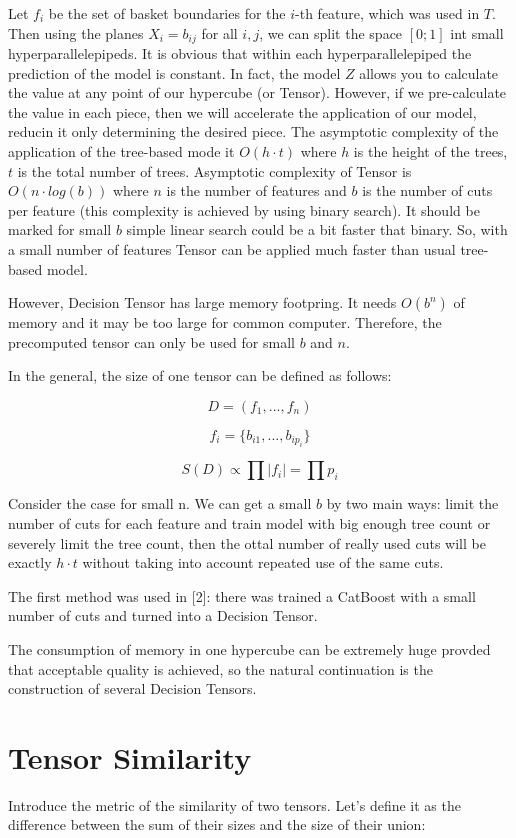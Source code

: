 \documentclass[a4paper]{jpconf}
\begin{document}
Let $f_i$ be the set of basket boundaries for the $i$-th feature, which was used in $T$. Then using the planes $X_i = b_{ij}$ for all $i,j$, we can split the space $[0;1]$ int small hyperparallelepipeds. It is obvious that within each hyperparallelepiped the prediction of the model is constant.
In fact, the model $Z$ allows you to calculate the value at any point of our hypercube (or Tensor). However, if we pre-calculate the value in each piece, then we will accelerate the application of our model, reducin it only determining the desired piece. The asymptotic complexity of the application of the tree-based mode it $O(h\cdot t)$ where $h$ is the height of the trees, $t$ is the total number of trees. Asymptotic complexity of Tensor is $O(n\cdot log(b))$ where $n$ is the number of features and $b$ is the number of cuts per feature (this complexity is achieved by using binary search). It should be marked for small $b$ simple linear search could be a bit faster that binary. So, with a small number of features Tensor can be applied much faster than usual tree-based model.

However, Decision Tensor has large memory footpring. It needs $O(b^n)$ of memory and it may be too large for common computer. Therefore, the precomputed tensor can only be used for small $b$ and $n$.

In the general, the size of one tensor can be defined as follows:

$$D = (f_{1}, ..., f_{n})$$

$$f_{i} = \{b_{i1}, ..., b_{ip_{i}}\}$$

$$S(D) \propto \prod |f_{i}| = \prod p_i$$

Consider the case for small n. We can get a small $b$ by two main ways: limit the number of cuts for each feature and train model with big enough tree count or severely limit the tree count, then the ottal number of really used cuts will be exactly $h\cdot t$ without taking into account repeated use of the same cuts.

The first method was used in [2]: there was trained a CatBoost with a small number of cuts and turned into a Decision Tensor.

The consumption of memory in one hypercube can be extremely huge provded that acceptable quality is achieved, so the natural continuation is the construction of several Decision Tensors.

\section{Tensor Similarity}
Introduce the metric of the similarity of two tensors. Let's define it as the difference between the sum of their sizes and the size of their union:
\end{document}
